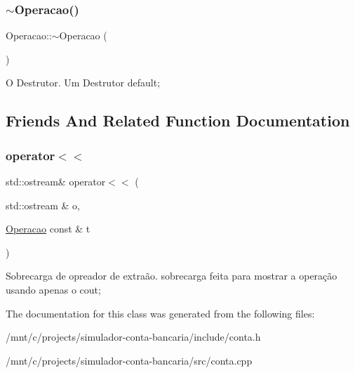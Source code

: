 \subsubsection{\texorpdfstring{$\sim$\+Operacao()}{~Operacao()}}
{\footnotesize\ttfamily Operacao\+::$\sim$\+Operacao (\begin{DoxyParamCaption}{ }\end{DoxyParamCaption})}

O Destrutor. Um Destrutor default; 

\subsection{Friends And Related Function Documentation}
\mbox{\label{classOperacao_a0671d43dc7d8405c6c76a9238b13217b}} 
\subsubsection{\texorpdfstring{operator$<$$<$}{operator<<}}
{\footnotesize\ttfamily std\+::ostream\& operator$<$$<$ (\begin{DoxyParamCaption}\item[{std\+::ostream \&}]{o,  }\item[{\hyperlink{classOperacao}{Operacao} const \&}]{t }\end{DoxyParamCaption})\hspace{0.3cm}{\ttfamily [friend]}}

Sobrecarga de opreador de extraão. sobrecarga feita para mostrar a operação usando apenas o cout; 

The documentation for this class was generated from the following files\+:\begin{DoxyCompactItemize}
\item 
/mnt/c/projects/simulador-\/conta-\/bancaria/include/conta.\+h\item 
/mnt/c/projects/simulador-\/conta-\/bancaria/src/conta.\+cpp\end{DoxyCompactItemize}
